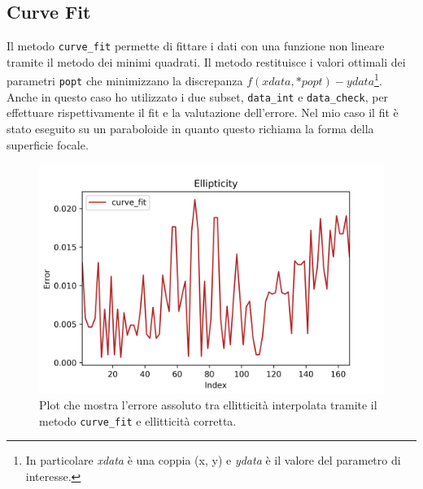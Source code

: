 \documentclass[12pt,a4paper,final]{book}
\begin{document}

\subsection{Curve Fit}\label{curve_fit}
Il metodo \texttt{curve\_fit} permette di fittare i dati con una funzione non lineare tramite il metodo dei minimi quadrati. Il metodo restituisce i valori ottimali dei parametri \texttt{popt} che minimizzano la discrepanza $f(xdata, *popt) - ydata$\footnote{In particolare \textit{xdata} è una coppia (x, y) e \textit{ydata} è il valore del parametro di interesse.}. Anche in questo caso ho utilizzato i due subset, \texttt{data\_int} e \texttt{data\_check}, per effettuare rispettivamente il fit e la valutazione dell'errore. Nel mio caso il fit è stato eseguito su un paraboloide in quanto questo richiama la forma della superficie focale.
\begin{figure}
	\centering
	\includegraphics[scale=0.8]{../figures/error_curve_fit.png}
	\caption{Plot che mostra l'errore assoluto tra ellitticità interpolata tramite il metodo \texttt{curve\_fit} e ellitticità corretta.}
	\label{err_curve_fit}
\end{figure}

\end{document}
